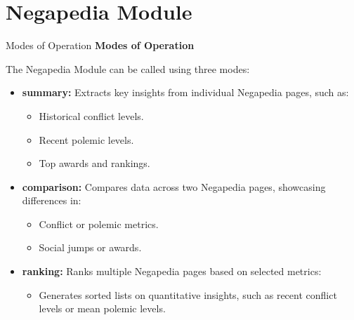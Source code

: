 \documentclass{beamer}
\begin{document}
\section{Negapedia Module}
    \begin{frame}{Modes of Operation}
        \textbf{Modes of Operation}
        
        The Negapedia Module can be called using three modes:
            \begin{itemize}
                \item \textbf{summary:}
                    Extracts key insights from individual Negapedia pages, such as:
                    \begin{itemize}
                        \item Historical conflict levels.
                        \item Recent polemic levels.
                        \item Top awards and rankings.
                    \end{itemize}
                \item \textbf{comparison:}
                    Compares data across two Negapedia pages, showcasing differences in:
                    \begin{itemize}
                        \item Conflict or polemic metrics.
                        \item Social jumps or awards.
                    \end{itemize}
                \item \textbf{ranking:}
                    Ranks multiple Negapedia pages based on selected metrics:
                    \begin{itemize}
                        \item Generates sorted lists on quantitative insights, such as recent conflict levels or mean polemic levels.
                    \end{itemize}
            \end{itemize}
    \end{frame}
\end{document}
